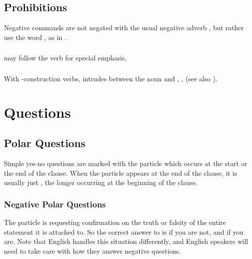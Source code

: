 \subsection{Prohibitions} Negative commands are not negated with the
usual negative adverb , but rather use the word , as in
 .
\label{syntax:prohibitions}

\subsubsection{}  may follow the verb for special emphasis,
 

\subsubsection{} With -construction verbs,  intrudes
between the noun and ,  ,
  (see also
).



\section{Questions}
\subsection{Polar Questions} 
Simple yes-no questions are marked with the particle  which
occurs at the start or the end of the clause.  When the particle
appears at the end of the clause, it is usually just , the
longer  occurring at the beginning of the
clause.   

\subsubsection{Negative Polar Questions} 
The particle  is requesting confirmation on the truth or
falsity of the entire statement it is attached to.  So the correct
answer to  
is  if you are not, and  if you are.  Note that
English handles this situation differently, and English speakers will
need to take care with how they answer negative questions.

